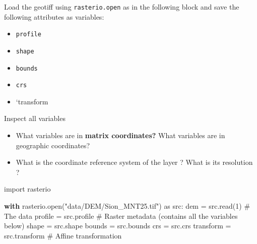 \documentclass[
  letterpaper,
  DIV=11,
  numbers=noendperiod]{scrartcl}
\newenvironment{Shaded}{\begin{snugshade}}{\end{snugshade}}
\newcommand{\BuiltInTok}[1]{\textcolor[rgb]{0.00,0.23,0.31}{#1}}
\newcommand{\CommentTok}[1]{\textcolor[rgb]{0.37,0.37,0.37}{#1}}
\newcommand{\ControlFlowTok}[1]{\textcolor[rgb]{0.00,0.23,0.31}{\textbf{#1}}}
\newcommand{\DecValTok}[1]{\textcolor[rgb]{0.68,0.00,0.00}{#1}}
\newcommand{\ImportTok}[1]{\textcolor[rgb]{0.00,0.46,0.62}{#1}}
\newcommand{\NormalTok}[1]{\textcolor[rgb]{0.00,0.23,0.31}{#1}}
\newcommand{\OperatorTok}[1]{\textcolor[rgb]{0.37,0.37,0.37}{#1}}
\newcommand{\StringTok}[1]{\textcolor[rgb]{0.13,0.47,0.30}{#1}}
\providecommand{\tightlist}{%
  \setlength{\itemsep}{0pt}\setlength{\parskip}{0pt}}
\begin{document}
\begin{tcolorbox}[enhanced jigsaw, arc=.35mm, left=2mm, toprule=.15mm, colbacktitle=quarto-callout-note-color!10!white, toptitle=1mm, breakable, opacityback=0, rightrule=.15mm, title=\textcolor{quarto-callout-note-color}{\faInfo}\hspace{0.5em}{Question}, colframe=quarto-callout-note-color-frame, bottomrule=.15mm, colback=white, opacitybacktitle=0.6, bottomtitle=1mm, titlerule=0mm, coltitle=black, leftrule=.75mm]

Load the geotiff using \texttt{rasterio.open} as in the following block
and save the following attributes as variables:

\begin{itemize}
\tightlist
\item
  \texttt{profile}
\item
  \texttt{shape}
\item
  \texttt{bounds}
\item
  \texttt{crs}
\item
  `transform
\end{itemize}

Inspect all variables

\begin{itemize}
\tightlist
\item
  What variables are in \textbf{matrix coordinates?} What variables are
  in geographic coordinates?
\item
  What is the coordinate reference system of the layer ? What is its
  resolution ?
\end{itemize}

\end{tcolorbox}

\begin{Shaded}
\begin{Highlighting}[]
\ImportTok{import}\NormalTok{ rasterio}

\ControlFlowTok{with}\NormalTok{ rasterio.}\BuiltInTok{open}\NormalTok{(}\StringTok{"data/DEM/Sion\_MNT25.tif"}\NormalTok{) }\ImportTok{as}\NormalTok{ src:}
\NormalTok{    dem }\OperatorTok{=}\NormalTok{ src.read(}\DecValTok{1}\NormalTok{) }\CommentTok{\# The data}
\NormalTok{    profile }\OperatorTok{=}\NormalTok{ src.profile }\CommentTok{\# Raster metadata (contains all the variables below)}
\NormalTok{    shape }\OperatorTok{=}\NormalTok{ src.shape}
\NormalTok{    bounds }\OperatorTok{=}\NormalTok{ src.bounds}
\NormalTok{    crs }\OperatorTok{=}\NormalTok{ src.crs}
\NormalTok{    transform }\OperatorTok{=}\NormalTok{ src.transform }\CommentTok{\# Affine transformation}
\end{Highlighting}
\end{Shaded}
\end{document}
